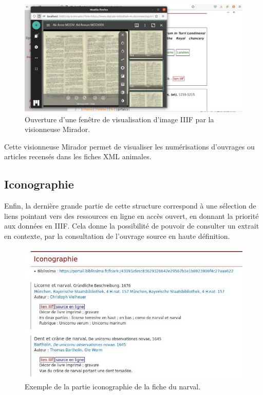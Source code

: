\documentclass[a4paper,12pt,twoside]{book}
\begin{document}
\begin{figure}[H]
    \centering
    \includegraphics[width=\linewidth]{img/partie_3/mirador.png}
    \caption{Ouverture d'une fenêtre de visualisation d'image \acrshort{IIIF} par la visionneuse Mirador.}
    \label{mirador-iiif}
\end{figure}

Cette visionneuse Mirador permet de visualiser les numérisations d'ouvrages ou articles recensés dans les fiches \acrshort{XML} animales.

\subsection{Iconographie}
Enfin, la dernière grande partie de cette structure correspond à une sélection de liens pointant vers des ressources en ligne en accès ouvert, en donnant la priorité aux données en \acrshort{IIIF}. Cela donne la possibilité de pouvoir de consulter un extrait en contexte, par la consultation de l'ouvrage source en haute définition.

\begin{figure}[H]
    \centering
    \includegraphics[width=12cm]{img/partie_3/icono.JPG}
    \caption{Exemple de la partie iconographie de la fiche du narval.}
    \label{icono}
\end{figure}
\end{document}
